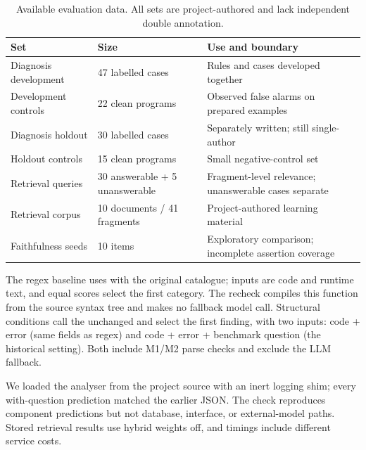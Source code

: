 \begin{table}[htbp]
\centering\footnotesize
\caption{Available evaluation data. All sets are project-authored and lack independent double annotation.}
\label{tab:datasets}
\begin{tabularx}{\textwidth}{p{37mm}p{26mm}Y}
\toprule
Set & Size & Use and boundary\\
\midrule
Diagnosis development & 47 labelled cases & Rules and cases developed together\\
Development controls & 22 clean programs & Observed false alarms on prepared examples\\
Diagnosis holdout & 30 labelled cases & Separately written; still single-author\\
Holdout controls & 15 clean programs & Small negative-control set\\
Retrieval queries & 30 answerable + 5 unanswerable & Fragment-level relevance; unanswerable cases separate\\
Retrieval corpus & 10 documents / 41 fragments & Project-authored learning material\\
Faithfulness seeds & 10 items & Exploratory comparison; incomplete assertion coverage\\
\bottomrule
\end{tabularx}
\end{table}

\label{sec:conditions}
The regex baseline uses  with the original catalogue; inputs are code and runtime text, and equal scores select the first category. The recheck compiles this function from the source syntax tree and makes no fallback model call. Structural conditions call the unchanged  and select the first finding, with two inputs: code + error (same fields as regex) and code + error + benchmark question (the historical setting). Both include M1/M2 parse checks and exclude the LLM fallback.

We loaded the analyser from the project source with an inert logging shim; every with-question prediction matched the earlier JSON. The check reproduces component predictions but not database, interface, or external-model paths. Stored retrieval results use hybrid weights off, and timings include different service costs.

